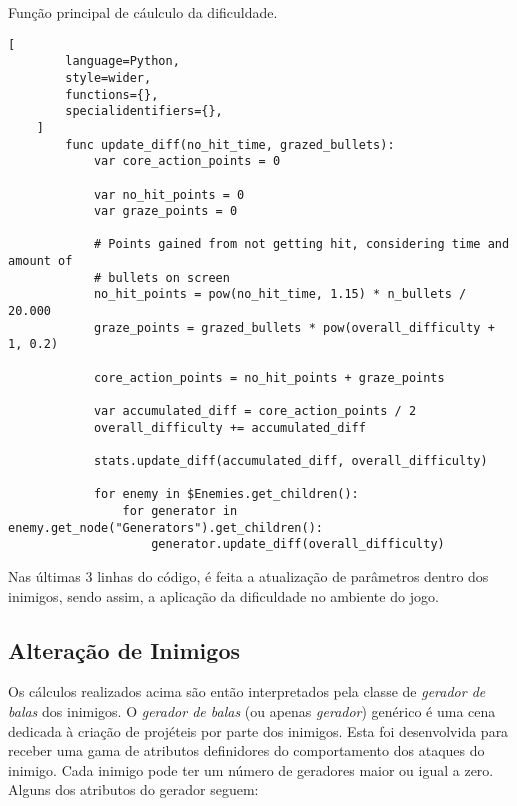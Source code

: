 \begin{programruledcaption}{Função principal de cáulculo da dificuldade\label{prog:diff_calc}.}
    \begin{lstlisting}[
        language=Python,
        style=wider,
        functions={},
        specialidentifiers={},
    ]
        func update_diff(no_hit_time, grazed_bullets):
            var core_action_points = 0
            
            var no_hit_points = 0
            var graze_points = 0
            
            # Points gained from not getting hit, considering time and amount of
            # bullets on screen
            no_hit_points = pow(no_hit_time, 1.15) * n_bullets / 20.000
            graze_points = grazed_bullets * pow(overall_difficulty + 1, 0.2)

            core_action_points = no_hit_points + graze_points
            
            var accumulated_diff = core_action_points / 2
            overall_difficulty += accumulated_diff

            stats.update_diff(accumulated_diff, overall_difficulty)
            
            for enemy in $Enemies.get_children():
                for generator in enemy.get_node("Generators").get_children():
                    generator.update_diff(overall_difficulty)
    \end{lstlisting}
\end{programruledcaption}

Nas últimas 3 linhas do código, é feita a atualização de parâmetros dentro dos inimigos, sendo assim, a aplicação da dificuldade no ambiente do jogo.

\subsection{Alteração de Inimigos}

Os cálculos realizados acima são então interpretados pela classe de \textit{gerador de balas} dos inimigos. O \textit{gerador de balas} (ou apenas \textit{gerador}) genérico é uma cena dedicada à criação de projéteis por parte dos inimigos. Esta foi desenvolvida para receber uma gama de atributos definidores do comportamento dos ataques do inimigo. Cada inimigo pode ter um número de geradores maior ou igual a zero. Alguns dos atributos do gerador seguem:

